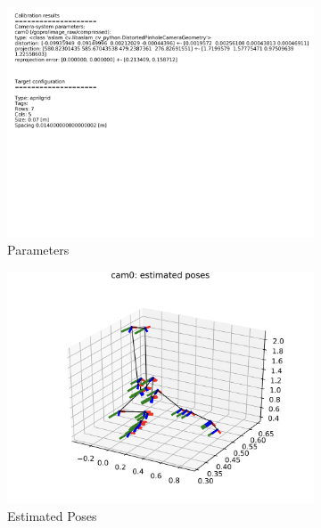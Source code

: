 \documentclass[11pt, oneside]{article}   	%
\begin{document}
\begin{figure}[ht]
\centering
\begin{subfigure}[b]{0.3\textwidth}
\includegraphics[width=\textwidth]{imgs/kalibr1.png}
\caption{Parameters}
\end{subfigure}
\begin{subfigure}[b]{0.3\textwidth}
\includegraphics[width=\textwidth]{imgs/kalibr2.png}
\caption{Estimated Poses}
\end{subfigure}
\begin{subfigure}[b]{0.3\textwidth}

\end{subfigure}
\end{figure}
\end{document}
